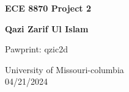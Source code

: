 \begin{titlepage}
    \begin{center}

        \vspace*{1cm}

        \Large
        \textbf{ECE 8870 Project 2}

        \vspace{0.5cm}
        \textbf{Qazi Zarif Ul Islam}

        Pawprint: qzic2d

        \large

        \vspace{0.8cm}

        University of Missouri-columbia \\
        04/21/2024
        
    \end{center}
\end{titlepage}